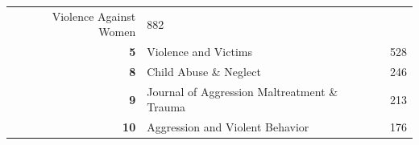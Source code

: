 \documentclass[]{tufte-handout}
\begin{document}
\begin{longtable}[]{@{}rlr@{}}
\begin{minipage}[t]{0.56\columnwidth}
Violence Against Women\strut
\end{minipage} & \begin{minipage}[t]{0.09\columnwidth}\raggedleft\strut
882\strut
\end{minipage}\tabularnewline
\begin{minipage}[t]{0.11\columnwidth}\raggedleft\strut
\textbf{5}\strut
\end{minipage} & \begin{minipage}[t]{0.56\columnwidth}\raggedright\strut
Violence and Victims\strut
\end{minipage} & \begin{minipage}[t]{0.09\columnwidth}\raggedleft\strut
528\strut
\end{minipage}\tabularnewline
\begin{minipage}[t]{0.11\columnwidth}\raggedleft\strut
\textbf{8}\strut
\end{minipage} & \begin{minipage}[t]{0.56\columnwidth}\raggedright\strut
Child Abuse \& Neglect\strut
\end{minipage} & \begin{minipage}[t]{0.09\columnwidth}\raggedleft\strut
246\strut
\end{minipage}\tabularnewline
\begin{minipage}[t]{0.11\columnwidth}\raggedleft\strut
\textbf{9}\strut
\end{minipage} & \begin{minipage}[t]{0.56\columnwidth}\raggedright\strut
Journal of Aggression Maltreatment \& Trauma\strut
\end{minipage} & \begin{minipage}[t]{0.09\columnwidth}\raggedleft\strut
213\strut
\end{minipage}\tabularnewline
\begin{minipage}[t]{0.11\columnwidth}\raggedleft\strut
\textbf{10}\strut
\end{minipage} & \begin{minipage}[t]{0.56\columnwidth}\raggedright\strut
Aggression and Violent Behavior\strut
\end{minipage} & \begin{minipage}[t]{0.09\columnwidth}\raggedleft\strut
176\strut
\end{minipage}\tabularnewline
\bottomrule
\end{longtable}
\end{document}
